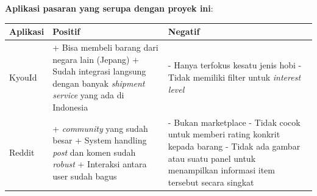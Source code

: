 \documentclass[a4paper]{article}
\begin{document}
\textbf{Aplikasi pasaran yang serupa dengan proyek ini}:
\begin{longtable}{|m{3cm}|p{5cm}|p{5cm}|}
    \hline
    Aplikasi & Positif                                                  & Negatif                \\
    \hline
    KyouId
             & + Bisa membeli barang dari negara lain (Jepang) \newline
    + Sudah integrasi langsung dengan banyak \textit{shipment service} yang ada di Indonesia \newline
             & - Hanya terfokus kesatu jenis hobi \newline
    - Tidak memiliki filter untuk \textit{interest level}                                        \\
    \hline
    Reddit
             & + \textit{community} yang sudah besar \newline
    + System handling \textit{post} dan komen sudah \textit{robust} \newline
    + Interaksi antara user sudah bagus
             & - Bukan marketplace \newline
    - Tidak cocok untuk memberi rating konkrit kepada barang \newline
    - Tidak ada gambar atau suatu panel untuk menampilkan informasi item tersebut secara singkat \\
    \hline
\end{longtable}
\end{document}
